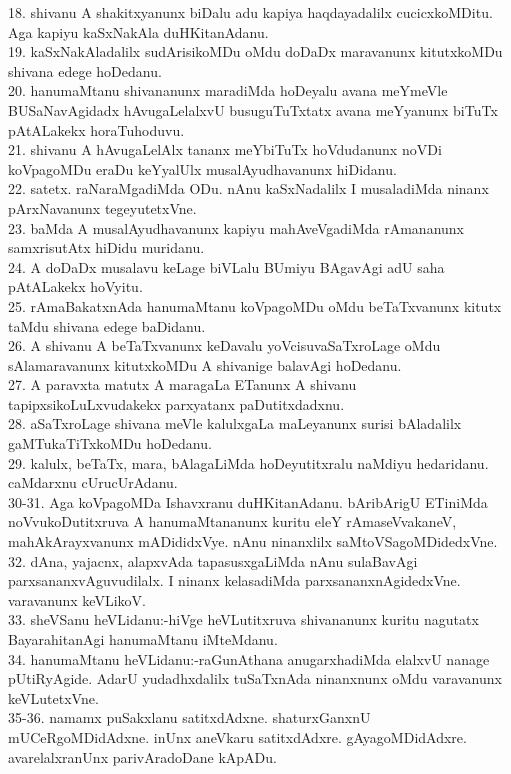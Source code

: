 \documentclass{article}
\begin{document}
18. shivanu A shakitxyanunx biDalu adu kapiya haqdayadalilx cucicxkoMDitu. Aga kapiyu kaSxNakAla duHKitanAdanu.\\
19. kaSxNakAladalilx sudArisikoMDu oMdu doDaDx maravanunx kitutxkoMDu shivana edege hoDedanu.\\
20. hanumaMtanu shivananunx maradiMda hoDeyalu avana meYmeVle BUSaNavAgidadx hAvugaLelalxvU busuguTuTxtatx avana meYyanunx biTuTx pAtALakekx horaTuhoduvu.\\
21. shivanu A hAvugaLelAlx tananx meYbiTuTx hoVdudanunx noVDi koVpagoMDu eraDu keYyalUlx musalAyudhavanunx hiDidanu.\\
22. satetx. raNaraMgadiMda ODu. nAnu kaSxNadalilx I musaladiMda ninanx pArxNavanunx tegeyutetxVne.\\
23. baMda A musalAyudhavanunx kapiyu mahAveVgadiMda rAmananunx samxrisutAtx hiDidu muridanu.\\
24. A doDaDx musalavu keLage biVLalu BUmiyu BAgavAgi adU saha pAtALakekx hoVyitu.\\
25. rAmaBakatxnAda hanumaMtanu koVpagoMDu oMdu beTaTxvanunx kitutx taMdu shivana edege baDidanu.\\
26. A shivanu A beTaTxvanunx keDavalu yoVcisuvaSaTxroLage oMdu sAlamaravanunx kitutxkoMDu A shivanige balavAgi hoDedanu.\\
27. A paravxta matutx A maragaLa ETanunx A shivanu tapipxsikoLuLxvudakekx parxyatanx paDutitxdadxnu.\\
28. aSaTxroLage shivana meVle kalulxgaLa maLeyanunx surisi bAladalilx gaMTukaTiTxkoMDu hoDedanu.\\
29. kalulx, beTaTx, mara, bAlagaLiMda hoDeyutitxralu naMdiyu hedaridanu. caMdarxnu cUrucUrAdanu.\\
30-31. Aga koVpagoMDa Ishavxranu duHKitanAdanu. bAribArigU ETiniMda noVvukoDutitxruva A hanumaMtananunx kuritu eleY rAmaseVvakaneV, mahAkArayxvanunx mADididxVye. nAnu ninanxlilx saMtoVSagoMDidedxVne.\\
32. dAna, yajacnx, alapxvAda tapasusxgaLiMda nAnu sulaBavAgi parxsananxvAguvudilalx. I ninanx kelasadiMda parxsananxnAgidedxVne. varavanunx keVLikoV.\\
33. sheVSanu heVLidanu:-hiVge heVLutitxruva shivananunx kuritu nagutatx BayarahitanAgi hanumaMtanu iMteMdanu.\\
34. hanumaMtanu heVLidanu:-raGunAthana anugarxhadiMda elalxvU nanage pUtiRyAgide. AdarU yudadhxdalilx tuSaTxnAda ninanxnunx oMdu varavanunx keVLutetxVne.\\
35-36. namamx puSakxlanu satitxdAdxne. shaturxGanxnU mUCeRgoMDidAdxne. inUnx aneVkaru satitxdAdxre. gAyagoMDidAdxre. avarelalxranUnx parivAradoDane kApADu.\\
\end{document}

